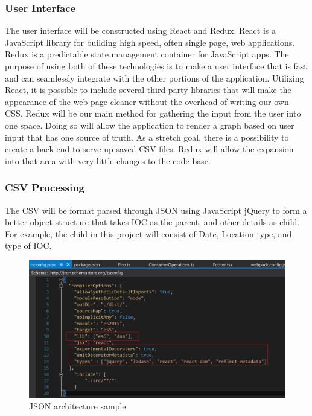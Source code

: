 \documentclass[journal,10pt,onecolumn,compsoc]{IEEEtran} \usepackage[margin=1.0in]{geometry} \usepackage{pdfpages}
\begin{document}
        \subsubsection{User Interface}
        The user interface will be constructed using React and Redux.  React is a JavaScript library for building high speed, often single page, web applications. Redux is a predictable state management container for JavaScript apps.
        The purpose of using both of these technologies is to make a user interface that is fast and can seamlessly integrate with the other portions of the application. Utilizing React, it is possible to include several third party libraries that will make the appearance of the web page cleaner without the overhead of writing our own CSS. Redux will be our main method for gathering the input from the user into one space. Doing so will allow the application to render a graph based on user input that has one source of truth. As a stretch goal, there is a possibility to create a back-end to serve up saved CSV files. Redux will allow the expansion into that area with very little changes to the code base.
        
        \subsubsection{CSV Processing}
        The CSV will be format parsed through JSON using JavaScript jQuery to form a better object structure that takes IOC as the parent, and other details as child. For example, the child in this project will consist of Date, Location type, and type of IOC.
        \begin{figure}[H]
            \centering
            \caption{JSON architecture sample}
            \includegraphics[width=\linewidth]{json.png}
        \end{figure}
\end{document}
